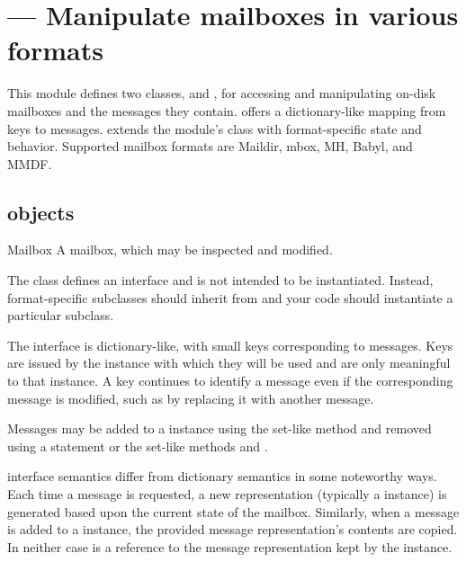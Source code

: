 \section{ ---
          Manipulate mailboxes in various formats}



This module defines two classes,  and , for
accessing and manipulating on-disk mailboxes and the messages they contain.
 offers a dictionary-like mapping from keys to messages.
 extends the  module's 
class with format-specific state and behavior. Supported mailbox formats are
Maildir, mbox, MH, Babyl, and MMDF.

\begin{seealso}
\end{seealso}

\subsection{ objects}
\label{mailbox-objects}

\begin{classdesc*}{Mailbox}
A mailbox, which may be inspected and modified.
\end{classdesc*}

The  class defines an interface and
is not intended to be instantiated.  Instead, format-specific
subclasses should inherit from  and your code
should instantiate a particular subclass.

The  interface is dictionary-like, with small keys
corresponding to messages. Keys are issued by the 
instance with which they will be used and are only meaningful to that
 instance. A key continues to identify a message even
if the corresponding message is modified, such as by replacing it with
another message.

Messages may be added to a  instance using the set-like
method  and removed using a  statement or the
set-like methods  and .

 interface semantics differ from dictionary semantics in some
noteworthy ways. Each time a message is requested, a new
representation (typically a  instance) is generated
based upon the current state of the mailbox. Similarly, when a message
is added to a  instance, the provided message
representation's contents are copied. In neither case is a reference
to the message representation kept by the  instance.

